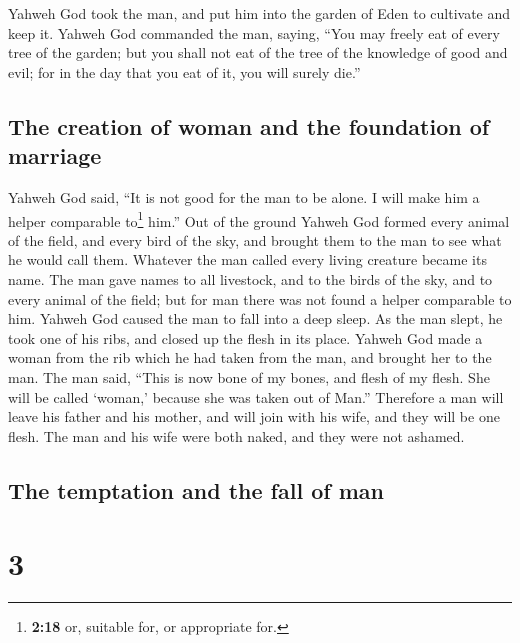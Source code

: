  Yahweh God took the man, and put him into the garden of
Eden to cultivate and keep it.  Yahweh God commanded the
man, saying, ``You may freely eat of every tree of the garden;
 but you shall not eat of the tree of the knowledge of
good and evil; for in the day that you eat of it, you will surely die.''

\hypertarget{the-creation-of-woman-and-the-foundation-of-marriage}{%
\subsection{The creation of woman and the foundation of
marriage}\label{the-creation-of-woman-and-the-foundation-of-marriage}}

 Yahweh God said, ``It is not good for the man to be
alone. I will make him a helper comparable to\footnote{\textbf{2:18} or,
  suitable for, or appropriate for.} him.''  Out of the
ground Yahweh God formed every animal of the field, and every bird of
the sky, and brought them to the man to see what he would call them.
Whatever the man called every living creature became its name.
 The man gave names to all livestock, and to the birds of
the sky, and to every animal of the field; but for man there was not
found a helper comparable to him.  Yahweh God caused the
man to fall into a deep sleep. As the man slept, he took one of his
ribs, and closed up the flesh in its place.  Yahweh God
made a woman from the rib which he had taken from the man, and brought
her to the man.  The man said, ``This is now bone of my
bones, and flesh of my flesh. She will be called `woman,' because she
was taken out of Man.''  Therefore a man will leave his
father and his mother, and will join with his wife, and they will be one
flesh.  The man and his wife were both naked, and they
were not ashamed.

\hypertarget{the-temptation-and-the-fall-of-man}{%
\subsection{The temptation and the fall of
man}\label{the-temptation-and-the-fall-of-man}}

\hypertarget{section-2}{%
\section{3}\label{section-2}}


